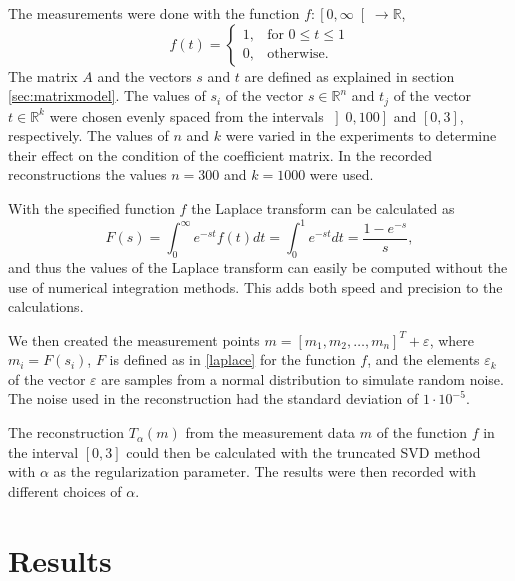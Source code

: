 \documentclass[12pt,a4]{article}
\newcommand{\R}{{\mathbb R}}
\newcommand{\ra}{\rightarrow}
\newcommand{\eps}{\varepsilon}
\begin{document}
The measurements were done with the function $f: \left[ 0, \infty \right[ \ra \R$,
\begin{equation}\label{eq:f}
f(t) = 
\begin{cases}
1, & \text{for } 0 \leq t \leq 1 \\
0, & \text{otherwise}.
\end{cases}
\end{equation}
The matrix $A$ and the vectors $s$ and $t$ are defined as explained in section \ref{sec:matrixmodel}. The values of $s_i$ of the vector $s \in \R^n$ and $t_j$ of the vector $t \in \R^k$ were chosen evenly spaced from the intervals $\left] 0, 100 \right]$ and $\left[ 0,3 \right]$, respectively. The values of $n$ and $k$ were varied in the experiments to determine their effect on the condition of the coefficient matrix. In the recorded reconstructions the values $n = 300$ and $k = 1000$ were used.

With the specified function $f$ the Laplace transform can be calculated as
\begin{equation}
F(s) = \int_0^{\infty} e^{-st} f(t) dt
     = \int_0^1 e^{-st} dt
     = \frac{1 - e^{-s}}{s},
\end{equation}
and thus the values of the Laplace transform can easily be computed without the use of numerical integration methods. This adds both speed and precision to the calculations.

We then created the measurement points $m = [m_1, m_2, \ldots, m_n]^T + \eps$, where $m_i = F(s_i)$, $F$ is defined as in \eqref{laplace} for the function $f$, and the elements $\eps_k$ of the vector $\eps$ are samples from a normal distribution to simulate random noise. The noise used in the reconstruction had the standard deviation of $1 \cdot 10^{-5}$.

The reconstruction $T_\alpha(m)$ from the measurement data $m$ of the function $f$ in the interval $\left[0,3\right]$ could then be calculated with the truncated SVD method with $\alpha$ as the regularization parameter. The results were then recorded with different choices of $\alpha$.



\section{Results}\label{sec:results}
\end{document}

